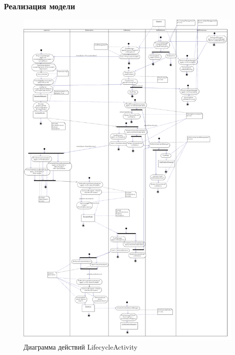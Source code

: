 \documentclass[14pt]{beamer}
\begin{document}
\begin{frame}
\frametitle{Реализация модели}
\begin{figure} [h] 
  \center
  \includegraphics [scale=0.15] {LifecycleActivity}
  \caption{Диаграмма действий LifecycleActivity} 
  \label{img:LifecycleActivity}  
\end{figure}
\end{frame}
\end{document}
